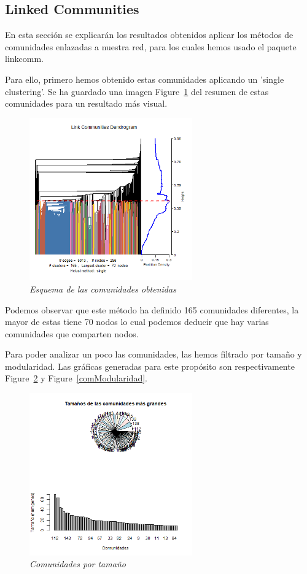 \subsection{Linked Communities}
En esta sección se explicarán los resultados obtenidos aplicar los métodos de comunidades enlazadas a nuestra red, para los cuales hemos usado el paquete linkcomm.

Para ello, primero hemos obtenido estas comunidades aplicando un 'single clustering'. Se ha guardado una imagen Figure~\ref{comunidades} del resumen de estas comunidades para un resultado más visual.

\begin{figure}[h]
	\centering
	\includegraphics[width=70mm,scale=1.2]{figures/covid_lc_summary.png}
	\caption{\textit{Esquema de las comunidades obtenidas}}
	\label{comunidades}
\end{figure}

Podemos observar que este método ha definido 165 comunidades diferentes, la mayor de estas tiene 70 nodos lo cual podemos deducir que hay varias comunidades que comparten nodos.

Para poder analizar un poco las comunidades, las hemos filtrado por tamaño y modularidad. Las gráficas generadas para este propósito son respectivamente Figure~\ref{comTamaño} y Figure~\ref{comModularidad}.

\begin{figure}[H]
	\centering
	\includegraphics[width=70mm,scale=1.2]{figures/lc_larger_clusters.png}
	\caption{\textit{Comunidades por tamaño}}
	\label{comTamaño}
\end{figure}

